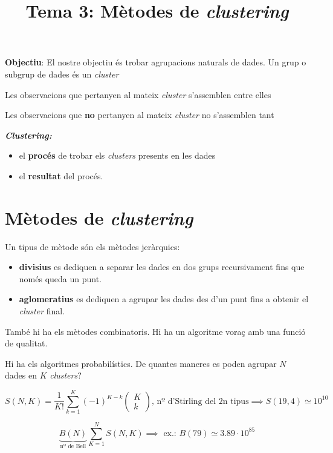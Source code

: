\documentclass[a4paper]{article}
\title{Tema 3: Mètodes de \emph{clustering}}
\begin{document}
	
\maketitle

\textbf{Objectiu}: El nostre objectiu és trobar agrupacions naturals de dades. Un grup o subgrup de dades és un \emph{cluster}

Les observacions que pertanyen al mateix \emph{cluster} s'assemblen entre elles

Les observacions que \textbf{no} pertanyen al mateix \emph{cluster} no s'assemblen tant

\textbf{\emph{Clustering:}}
\begin{itemize}
	\item el \textbf{procés} de trobar els \emph{clusters} presents en les dades
	\item el \textbf{resultat} del procés.
\end{itemize}


\section{Mètodes de \emph{clustering}}

Un tipus de mètode són els mètodes jeràrquics:
\begin{itemize}
	\item \textbf{divisius} es dediquen a separar les dades en dos grups recursivament fins que només queda un punt.
	\item \textbf{aglomeratius} es dediquen a agrupar les dades des d'un punt fins a obtenir el \emph{cluster} final.
\end{itemize}


També hi ha els mètodes combinatoris. Hi ha un algoritme voraç amb una funció de qualitat.

Hi ha els algoritmes probabilístics. De quantes maneres es poden agrupar $N$ dades en $K$ \emph{clusters}?

$$ S(N, K) = \frac{1}{K!} \sum_{k=1}^K (-1)^{K-k} \begin{pmatrix}
K \\ k
\end{pmatrix} \text{, nº d'Stirling del 2n tipus} \implies S(19,4) \simeq 10^{10} $$

$$ \underbrace{B(N)}_{\text{nº de Bell}} \sum_{K=1}^{N} S(N,K) \implies \text{ ex.: } B(79) \simeq 3.89·10^85 $$
\end{document}
